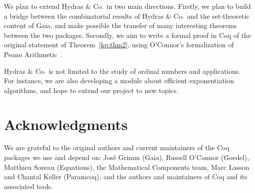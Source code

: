 \documentclass{easychair}
\newcommand{\coq}{Coq\xspace}
\newcommand{\gaia}{Gaia\xspace}
\newcommand{\Hydras}{Hydras \& Co$\text.$\xspace}
\begin{document}


We plan to extend \Hydras in two main directions. Firstly, we plan to build a bridge between the combinatorial results of \Hydras and the set-theoretic content of \gaia, and make possible the transfer of many interesting theorems between the two packages. Secondly, we aim to write a formal proof in \coq of the original statement of Theorem~\ref{kp:thm2}, using O'Connor's formalization of Peano Arithmetic~\cite{Goedel}.

\Hydras is not limited to the study of ordinal numbers and applications.
For instance, we are also developing  a module about efficient exponentiation
algorithms, and hope to extend our project to new topics.

\section{Acknowledgments}
\label{sect:acks}
We are grateful to the original authors and current maintainers of the Coq packages we use and depend on: José Grimm (Gaia), Russell O'Connor (Goedel), Matthieu Sozeau (Equations), the Mathematical Components team, Marc Lasson and Chantal Keller (Paramcoq), and the authors and maintainers of \coq and its associated tools.


\label{sect:bib}

%
%
%

\end{document}
